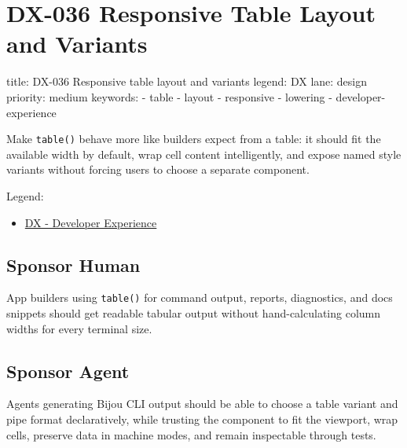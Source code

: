\chapter{DX-036 Responsive Table Layout and Variants}\label{record-133}

\smallskip

\begin{RecordMeta}
title: DX-036 Responsive table layout and variants
legend: DX
lane: design
priority: medium
keywords:
  - table
  - layout
  - responsive
  - lowering
  - developer-experience

\end{RecordMeta}

Make \texttt{t\allowbreak{}a\allowbreak{}b\allowbreak{}l\allowbreak{}e\allowbreak{}(\allowbreak{})} behave more like builders expect from a table: it should fit the available width by default, wrap cell content intelligently, and expose named style variants without forcing users to choose a separate component.

Legend:

\begin{itemize}
\tightlist
\item
  \href{https://github.com/flyingrobots/bijou/blob/1853ad902f6bf219326409e7f743a5a1d6517dbc/docs/legends/DX-developer-experience.md}{DX - Developer Experience}
\end{itemize}

\section{Sponsor Human}\label{record-133-sponsor-human}

App builders using \texttt{t\allowbreak{}a\allowbreak{}b\allowbreak{}l\allowbreak{}e\allowbreak{}(\allowbreak{})} for command output, reports, diagnostics, and docs snippets should get readable tabular output without hand-calculating column widths for every terminal size.

\section{Sponsor Agent}\label{record-133-sponsor-agent}

Agents generating Bijou CLI output should be able to choose a table variant and pipe format declaratively, while trusting the component to fit the viewport, wrap cells, preserve data in machine modes, and remain inspectable through tests.

